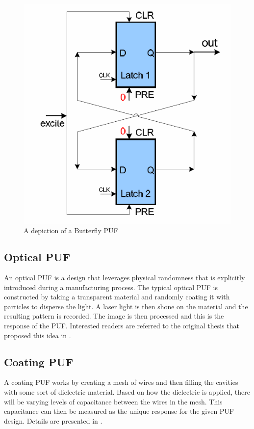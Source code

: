 \begin{figure}[ht!]
\includegraphics[scale=.70]{images/butterflypuf.png}
\caption{A depiction of a Butterfly PUF}
\label{fig:butterfly}
\end{figure}
\FloatBarrier

\subsection{Optical PUF}
An optical PUF is a design that leverages physical randomness that is explicitly introduced during
a manufacturing process. The typical optical PUF is constructed by taking a transparent material
and randomly coating it with particles to disperse the light. A laser light is then shone on the material
and the resulting pattern is recorded. The image is then processed and this is the response of the
PUF. Interested readers are referred to the original thesis that proposed this idea in \cite{opticalpuf}.

\subsection{Coating PUF}
A coating PUF works by creating a mesh of wires and then filling the cavities with some sort of
dielectric material. Based on how the dielectric is applied, there will be varying levels of capacitance
between the wires in the mesh. This capacitance can then be measured as the unique response for
the given PUF design. Details are presented in \cite{coatingpuf}. 

